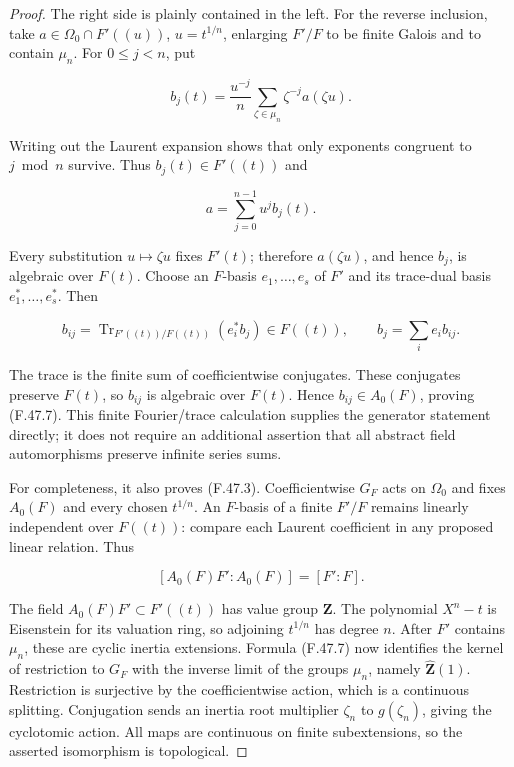 \begin{proof}
The right side is plainly contained in the left. For the reverse inclusion, take \(a\in\Omega_0\cap F'((u))\), \(u=t^{1/n}\), enlarging \(F'/F\) to be finite Galois and to contain \(\mu_n\). For \(0\leq j<n\), put

\[
 b_j(t)=\frac{u^{-j}}{n}
        \sum_{\zeta\in\mu_n}\zeta^{-j}a(\zeta u).
 \tag{F.47.8}
\]

Writing out the Laurent expansion shows that only exponents congruent to \(j\bmod n\) survive. Thus \(b_j(t)\in F'((t))\) and

\[
                              a=\sum_{j=0}^{n-1}u^j b_j(t).
\]

Every substitution \(u\mapsto\zeta u\) fixes \(F'(t)\); therefore \(a(\zeta u)\), and hence \(b_j\), is algebraic over \(F(t)\). Choose an \(F\)-basis \(e_1,\ldots,e_s\) of \(F'\) and its trace-dual basis \(e_1^*,\ldots,e_s^*\). Then

\[
 b_{ij}=\operatorname{Tr}_{F'((t))/F((t))}(e_i^*b_j)
          \in F((t)),\qquad
 b_j=\sum_i e_i b_{ij}.
 \tag{F.47.9}
\]

The trace is the finite sum of coefficientwise conjugates. These conjugates preserve \(F(t)\), so \(b_{ij}\) is algebraic over \(F(t)\). Hence \(b_{ij}\in A_0(F)\), proving (F.47.7). This finite Fourier/trace calculation supplies the generator statement directly; it does not require an additional assertion that all abstract field automorphisms preserve infinite series sums.

For completeness, it also proves (F.47.3). Coefficientwise \(G_F\) acts on \(\Omega_0\) and fixes \(A_0(F)\) and every chosen \(t^{1/n}\). An \(F\)-basis of a finite \(F'/F\) remains linearly independent over \(F((t))\): compare each Laurent coefficient in any proposed linear relation. Thus

\[
                  [A_0(F)F':A_0(F)]=[F':F].
\]

The field \(A_0(F)F'\subset F'((t))\) has value group \(\mathbf Z\). The polynomial \(X^n-t\) is Eisenstein for its valuation ring, so adjoining \(t^{1/n}\) has degree \(n\). After \(F'\) contains \(\mu_n\), these are cyclic inertia extensions. Formula (F.47.7) now identifies the kernel of restriction to \(G_F\) with the inverse limit of the groups \(\mu_n\), namely \(\widehat{\mathbf Z}(1)\). Restriction is surjective by the coefficientwise action, which is a continuous splitting. Conjugation sends an inertia root multiplier \(\zeta_n\) to \(g(\zeta_n)\), giving the cyclotomic action. All maps are continuous on finite subextensions, so the asserted isomorphism is topological.


\end{proof}
